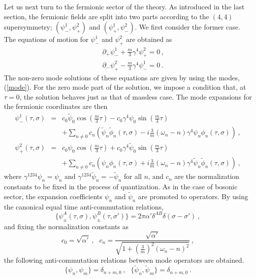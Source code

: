 \documentclass[a4paper,12pt]{article}
\begin{document}
Let us next turn to the fermionic sector of the theory.  As introduced
in the last section, the fermionic fields are split into two parts
according to the $(4,4)$ supersymmetry; $(\psi^1_-, \psi^2_+)$ and
$(\psi^1_+, \psi^2_-)$.  We first consider the former case.  The
equations of motion for $\psi^1_-$ and $\psi^2_+$ are obtained as
\begin{eqnarray}
& & \partial_+ \psi^1_- + \frac{m}{3} \gamma^4 \psi^2_+ = 0 ~,
                                      \nonumber \\
& & \partial_- \psi^2_+ - \frac{m}{3} \gamma^4 \psi^1_- = 0 ~.
\label{feom}
\end{eqnarray}
The non-zero mode solutions of these equations are given by using the
modes, (\ref{mode}). For the zero mode part of the solution, we impose
a condition that, at $\tau=0$, the solution behaves just as that of
massless case.  The mode expansions for the fermionic coordinates are
then
\begin{eqnarray}
\psi^1_- (\tau, \sigma) 
 &=& c_0 \tilde{\psi}_0 \cos \left( \frac{m}{3} \tau \right) 
     - c_0 \gamma^4 \psi_0 \sin \left( \frac{m}{3} \tau \right) 
                              \nonumber \\
 & & + \sum_{n \neq 0} c_n 
      \left( 
         \tilde{\psi}_n \tilde{\phi}_n (\tau, \sigma)
         - i \frac{3}{m} (\omega_n - n) 
            \gamma^4 \psi_n \phi_n (\tau, \sigma ) 
      \right)~,
                               \nonumber \\
\psi^2_+ (\tau, \sigma) 
 &=& c_0 \psi_0 \cos \left( \frac{m}{3} \tau \right) 
     + c_0 \gamma^4 \tilde{\psi}_0 
        \sin \left( \frac{m}{3} \tau \right) 
                              \nonumber \\
 & & + \sum_{n \neq 0} c_n 
      \left( 
         \psi_n \phi_n (\tau, \sigma)
         + i \frac{3}{m} (\omega_n - n) 
            \gamma^4 \tilde{\psi}_n \tilde{\phi}_n (\tau, \sigma ) 
      \right)~,
\label{fmode}
\end{eqnarray}
where $\gamma^{1234} \psi_n = \psi_n$ and $\gamma^{1234}
\tilde{\psi}_n = -\tilde{\psi}_n$ for all $n$, and $c_n$ are the
normalization constants to be fixed in the process of quantization.
As in the case of bosonic sector, the expansion coefficients $\psi_n$
and $\tilde{\psi}_n$ are promoted to operators.  By using the
canonical equal time anti-commutation relations,
\begin{equation}
\{ \psi^A_\pm (\tau, \sigma), \psi^B_\pm (\tau, \sigma') \}
= 2 \pi \alpha' \delta^{AB} \delta (\sigma - \sigma') ~,
\label{fcom}
\end{equation}
and fixing the normalization constants as
\[
c_0 = \sqrt{\alpha'}~,~~~
c_n = \frac{\sqrt{\alpha'}}{\sqrt{1 + 
          \left( \frac{3}{m} \right)^2 (\omega_n - n)^2 } }~,
\]
the following anti-commutation relations between mode operators are
obtained.
\begin{equation}
\{ \psi_n , \psi_m \} = \delta_{n+m,0} ~,~~~
\{ \tilde{\psi}_n, \tilde{\psi}_m \} = \delta_{n+m,0}~.
\label{fmcom}
\end{equation}
\end{document}

